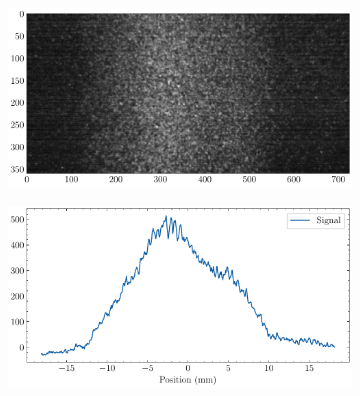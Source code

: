 \begin{figure}  
  \begin{subfigure}{0.5\textwidth}
    \includegraphics[width=\textwidth]{04_IPHI_Test/figures/fig000_limits_IPHI_a}
    \caption{}
    \label{}
  \end{subfigure}

  \begin{subfigure}{0.5\textwidth}
    \includegraphics[width=\textwidth]{04_IPHI_Test/figures/fig000_limits_IPHI_b}
    \caption{}
    \label{}
  \end{subfigure}
  \caption[]{ }
  \label{chap4:limits_IPHI}
\end{figure}
